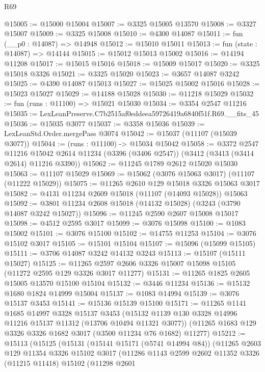\begin{lexlean}{R69}
\begin{coremodule}
@15005 := @15000 @15004
@15007 := @3325 @15005 @13570
@15008 := @3327 @15007
@15009 := @3325 @15008
@15010 := @4300 @14087
@15011 := fun (__p0 : @14087) => @14948
@15012 := @15010 @15011
@15013 := fun (state : @14087) => @14144
@15015 := @15012 @15013 @15002
@15016 := @14194 @11208
@15017 := @15015 @15016
@15018 := @15009 @15017
@15020 := @3325 @15018 @3326
@15021 := @3325 @15020
@15023 := @3657 @14087 @3242
@15025 := @4390 @14087 @15013
@15027 := @15025 @15002 @15016
@15028 := @15023 @15027
@15029 := @14188 @15028
@15030 := @11218 @15029
@15032 := fun (runs : @11100) => @15021 @15030
@15034 := @3354 @2547 @11216
@15035 := LexLeanPreserve.C7b2515af0eddeea59726419a6840f51f.R69.__fits_45
@15036 := @15035 @3077
@15037 := @3358 @15036
@15039 := LexLeanStd.Order.mergePass @3074
@15042 := @15037 (@11107 (@15039 @3077))
@15044 := (runs : @11100) -> @15034 @15042
@15058 := @3372
    @2547
    @11216
    @15042
    @2614
    @11234
    (@3396 (@3406 @2547))
    (@3412 (@3413 (@3414 @2614) @11216 @3390))
@15062 := @11245 @1789 @2612 @15020 @15030
@15063 := @11107 @15029
@15069 := @15062 (@3076 @15063 @3017) (@11107 (@11222 @15029))
@15075 := @11265 @2610 @129 @15018 @3326 @15063 @3017
@15082 := @4131 @11234 @2609 @15018 (@11107 (@14093 @15028)) @15063
@15092 := @3801 @11234 @2608 @15018 (@14132 @15028) (@3243 (@3790 @14087 @3242 @15027))
@15096 := @11245 @2590 @2607 @15008 @15017
@15098 := @4512 @2595 @3017
@15099 := @3076 @15098
@15100 := @1083 @15002
@15101 := @3076 @15100
@15102 := @14755 @11253
@15104 := @3076 @15102 @3017
@15105 := @15101 @15104
@15107 := @15096 (@15099 @15105)
@15111 := @3706 @14087 @3242 @14132 @3243
@15113 := @15107 (@15111 @15027)
@15125 := @11265 @2597 @2606 @3326 @15007 @15098 @15105 (@11272 @2595 @129 @3326 @3017 @11277)
@15131 := @11265 @1825 @2605 @15005 @13570 @15100 @15104
@15132 := @3446 @11234
@15136 := @15132 @1680 @1824 @14999 @15004
@15137 := @1083 @14994
@15139 := @3076 @15137 @3453
@15141 := @15136 @15139 @15100
@15171 := @11265
    @1141
    @1685
    @14997
    @3328
    @15137
    @3453
    (@15132 @1139 @130 @3328 @14996 @11216 @15137 @11312 (@13706 @10494 @11321 @3077))
    (@11265 @1683 @129 @3326 @3326 @1682 @3017 (@3500 @11234 @76 @1682) @11277)
@15212 := @15113
    (@15125
      (@15131
        (@15141 @15171 (@5741 @14994 @84))
        (@11265
          @2603
          @129
          @11354
          @3326
          @15102
          @3017
          (@11286
            @1143
            @2599
            @2602
            @11352
            @3326
            (@11215 @11418)
            @15102
            (@11298
              @2601

\end{coremodule}
\end{lexlean}
